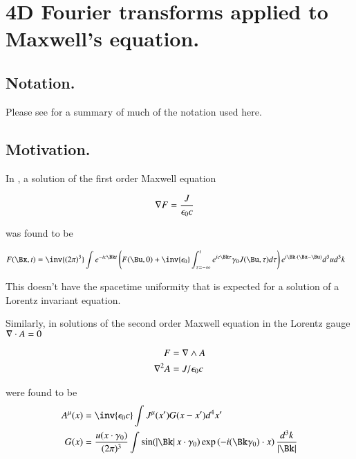 \chapter{4D Fourier transforms applied to Maxwell's equation.}\label{chap:PJ4dFourier}
\date{ Feb 1, 2009.  $RCSfile: 4dFourier.tex,v $ Last $Revision: 1.14 $ $Date: 2009/10/22 02:07:20 $ }

\section{Notation. }

Please see  for a summary of much of the notation used here.

\section{Motivation. }

In , a solution of the first order Maxwell equation

\begin{align}
\nabla F &= \frac{J }{\epsilon_0 c}
\end{align}

was found to be

\begin{align}
F(\Bx,t) 
&=
\inv{({2\pi})^3} \int 
e^{-i c \Bk t}
\left(
F(\Bu, 0) + \inv{\epsilon_0} \int_{\tau = -\infty}^{t} e^{i c \Bk \tau } \gamma_0 J(\Bu,\tau)  d\tau  
\right)
e^{i \Bk \cdot (\Bx-\Bu)} 
d^3 u
d^3 k
\end{align}

This doesn't have the spacetime uniformity that is expected for a solution of a Lorentz invariant equation.

Similarly, in  solutions of the second order Maxwell equation in the Lorentz gauge
$\nabla \cdot A = 0$ 

\begin{align*}
F &= \nabla \wedge A \\
\nabla^2 A &= J/\epsilon_0 c
\end{align*}

were found to be
\begin{align}\label{eqn:4d_fourier:fourVectorPotentials}
{A^\mu}(x)
&= \inv{\epsilon_0 c} \int J^\mu(x') G(x - x') d^4 x' \\
G(x)
&= 
\frac{u(x \cdot \gamma_0)}{ (2\pi)^3 }
\int
\sin( \Abs{\Bk} x \cdot \gamma_0 )
\exp\left( -i (\Bk \gamma_0) \cdot x \right)
\frac{d^3 k}{ \Abs{\Bk} }
\end{align}

